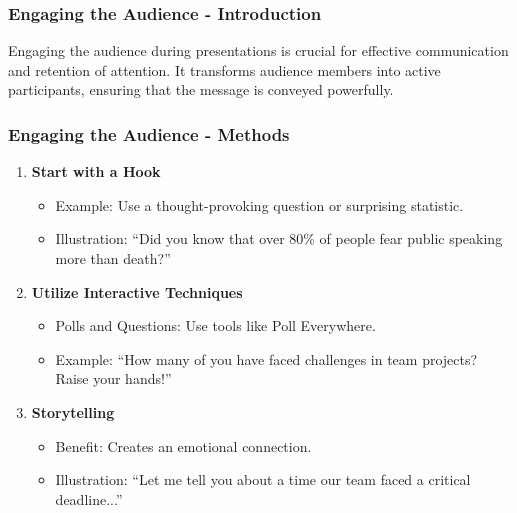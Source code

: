 \documentclass{beamer}
\begin{document}
\begin{frame}[fragile]
    \frametitle{Engaging the Audience - Introduction}
    Engaging the audience during presentations is crucial for effective communication and retention of attention. It transforms audience members into active participants, ensuring that the message is conveyed powerfully.
\end{frame}

\begin{frame}[fragile]
    \frametitle{Engaging the Audience - Methods}
    \begin{enumerate}
        \item \textbf{Start with a Hook}
        \begin{itemize}
            \item Example: Use a thought-provoking question or surprising statistic.
            \item Illustration: “Did you know that over 80\% of people fear public speaking more than death?”
        \end{itemize}
        
        \item \textbf{Utilize Interactive Techniques}
        \begin{itemize}
            \item Polls and Questions: Use tools like Poll Everywhere.
            \item Example: “How many of you have faced challenges in team projects? Raise your hands!”
        \end{itemize}
        
        \item \textbf{Storytelling}
        \begin{itemize}
            \item Benefit: Creates an emotional connection.
            \item Illustration: “Let me tell you about a time our team faced a critical deadline...”
        \end{itemize}
    \end{enumerate}
\end{frame}
\end{document}

